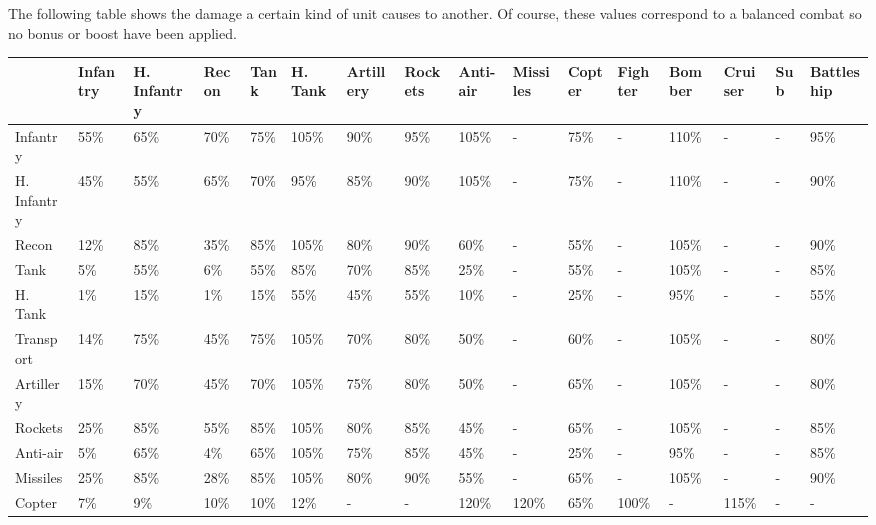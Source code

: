 The following table shows the damage a certain kind of unit causes to another.
Of course, these values correspond to a balanced combat so no bonus or boost
have been applied.\\

\begin{table}[H]
    \label{tab:combat}
    \begin{center}
    \tiny{
    \begin{tabular}{| l | l | l | l | l | l | l | l | l | l | l | l | l | l | l | l |}
        \hline
         & Infantry & H. Infantry & Recon & Tank & H. Tank & Artillery & Rockets & Anti-air & Missiles & Copter & Fighter & Bomber & Cruiser & Sub & Battleship \\
        \hline
        Infantry & 55\% & 65\% & 70\% & 75\% & 105\% & 90\% & 95\% & 105\% & - & 75\% & -
        & 110\% & - & - & 95\% \\ 
        \hline
        H. Infantry & 45\% & 55\% & 65\% & 70\% & 95\% & 85\% & 90\% & 105\% & - & 75\% &
        -& 110\% & - & - & 90\% \\ 
        \hline
        Recon & 12\% & 85\% & 35\% & 85\% & 105\% & 80\% & 90\% & 60\% & - & 55\% & - & 105\% & - & - & 90\% \\ 
        \hline
        Tank & 5\% & 55\% & 6\% & 55\% & 85\% & 70\% & 85\% & 25\% & - & 55\% & - & 105\% & - & - & 85\% \\ 
        \hline
        H. Tank & 1\% & 15\% & 1\% & 15\% & 55\% & 45\% & 55\% & 10\% & - & 25\% & - & 95\% & - & - & 55\% \\ 
        \hline
        Transport & 14\% & 75\% & 45\% & 75\% & 105\% & 70\% & 80\% & 50\% & - & 60\% & - & 105\% & - & - & 80\% \\ 
        \hline
        Artillery & 15\% & 70\% & 45\% & 70\% & 105\% & 75\% & 80\% & 50\% & - & 65\% & - & 105\% & - & - & 80\% \\ 
        \hline
        Rockets & 25\% & 85\% & 55\% & 85\% & 105\% & 80\% & 85\% & 45\% & - & 65\% & - & 105\% & - & - & 85\% \\ 
        \hline
        Anti-air & 5\% & 65\% & 4\% & 65\% & 105\% & 75\% & 85\% & 45\% & - & 25\% & - & 95\% & - & - & 85\% \\ 
        \hline
        Missiles & 25\% & 85\% & 28\% & 85\% & 105\% & 80\% & 90\% & 55\% & - & 65\% & - & 105\% & - & - & 90\% \\ 
        \hline
        Copter & 7\% & 9\% & 10\% & 10\% & 12\% & - & - & 120\% & 120\% & 65\% & 100\% & - & 115\% & - & - \\ 

\end{tabular}}
\end{center}
\end{table}
